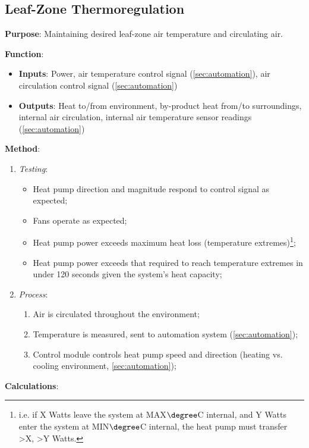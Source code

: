 \subsection{Leaf-Zone Thermoregulation}
\label{sec:airthermoregulation}

\textbf{Purpose}: Maintaining desired leaf-zone air temperature and circulating air.

\textbf{Function}:
\begin{itemize}
    \item \textbf{Inputs}: Power, air temperature control signal (\ref{sec:automation}), air circulation control signal (\ref{sec:automation})
    \item \textbf{Outputs}: Heat to/from environment, by-product heat from/to surroundings, internal air circulation, internal air temperature sensor readings (\ref{sec:automation})
\end{itemize}

\textbf{Method}:
\begin{enumerate}
    \item \textit{Testing}:
    \begin{itemize}
        \item Heat pump direction and magnitude respond to control signal as expected;
        \item Fans operate as expected;
        \item Heat pump power exceeds maximum heat loss (temperature extremes)\footnote{i.e. if X Watts leave the system at MAX$\degree$C internal, and Y Watts enter the system at MIN$\degree$C internal, the heat pump must transfer >X, >Y Watts.};
        \item Heat pump power exceeds that required to reach temperature extremes in under 120 seconds given the system's heat capacity;
    \end{itemize}
    \item \textit{Process}:
    \begin{enumerate}
        \item Air is circulated throughout the environment;
        \item Temperature is measured, sent to automation system (\ref{sec:automation});
        \item Control module controls heat pump speed and direction (heating vs. cooling environment, \ref{sec:automation});
    \end{enumerate}
\end{enumerate}

\textbf{Calculations}:

